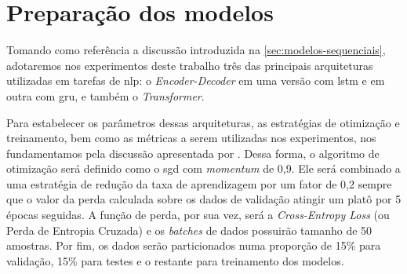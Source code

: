 \section{Preparação dos modelos}
\label{sec:metodologia-preparacao-modelos}







Tomando como referência a discussão introduzida na \autoref{sec:modelos-sequenciais}, adotaremos nos experimentos deste trabalho três das principais arquiteturas utilizadas em tarefas de \acrfull{nlp}: o \textit{Encoder-Decoder} em uma versão com \acrfull{lstm} e em outra com \acrfull{gru}, e também o \textit{Transformer}.


Para estabelecer os parâmetros dessas arquiteturas, as estratégias de otimização e treinamento, bem como as métricas a serem utilizadas nos experimentos, nos fundamentamos pela discussão apresentada por .
Dessa forma, o algoritmo de otimização será definido como o \acrfull{sgd} com \textit{momentum} de 0,9. Ele será combinado a uma estratégia de redução da taxa de aprendizagem por um fator de 0,2 sempre que o valor da perda calculada sobre os dados de validação atingir um platô por 5 épocas seguidas. A função de perda, por sua vez, será a \textit{Cross-Entropy Loss} (ou Perda de Entropia Cruzada) e os \textit{batches} de dados possuirão tamanho de 50 amostras. Por fim, os dados serão particionados numa proporção de 15\% para validação, 15\% para testes e o restante para treinamento dos modelos.

